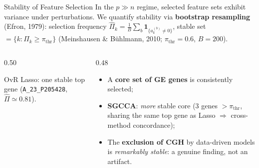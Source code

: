 \documentclass[aspectratio=169, 10pt]{beamer}
\begin{document}
\begin{frame}{Stability of Feature Selection}
  In the $p \gg n$ regime, selected feature sets exhibit variance under perturbations. We quantify stability via \textbf{bootstrap resampling} (Efron, 1979): selection frequency $\hat{\Pi}_k = \frac{1}{B} \sum_b \mathbf{1}_{\{a_k^{(b)} \ne 0\}}$, stable set $= \{k : \hat{\Pi}_k \ge \pi_{\text{thr}}\}$ (Meinshausen \& Bühlmann, 2010; $\pi_{\text{thr}} = 0.6$, $B = 200$).

  \bigskip
  \begin{columns}[T]
    \begin{column}{0.50\textwidth}
      \centering
      \vskip 2pt
        {\footnotesize OvR Lasso: one stable top gene (\texttt{A\_23\_P205428}, $\hat{\Pi} \simeq 0.81$).}
    \end{column}

    \begin{column}{0.48\textwidth}
      \begin{itemize}
        \item A \textbf{core set of GE genes} is consistently selected;
        \item \textbf{SGCCA}: \textit{more} stable core (3 genes $> \pi_{\text{thr}}$, sharing the same top gene as Lasso $\Rightarrow$ cross-method concordance);
        \item The \textbf{exclusion of CGH} by data-driven models is \textit{remarkably stable}: a genuine finding, not an artifact.
      \end{itemize}
    \end{column}
  \end{columns}
\end{frame}
\end{document}
